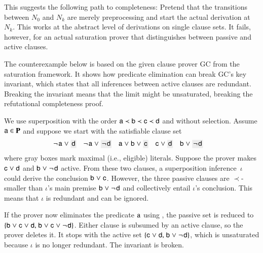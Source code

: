 \begin{rep}
This suggests the following path to completeness: Pretend that the transitions
between $N_0$ and $N_k$ are merely preprocessing and start the actual
derivation at $N_k$. This works at the abstract level of derivations on single
clause sets. It fails, however, for an actual saturation prover that
distinguishes between passive and active clauses.

\begin{exa}
\label{ex:cex-predelim-sat}
The counterexample below is based on the given clause prover \textsf{GC}
from the saturation framework. It shows how predicate elimination can break
\textsf{GC}'s key invariant, which states that all inferences between active
clauses are redundant. Breaking the invariant means that the limit might be
unsaturated, breaking the refutational completeness proof.

We use superposition with the order $\mathsf{a} \prec
\mathsf{b} \prec \mathsf{c} \prec \mathsf{d}$ and without selection.
Assume $\mathsf{a} \in \mathbf{P}$ and
suppose we start with the satisfiable clause set %
%
\begin{align*}
  & \neglit{\cst{a}} \cor \MAX{\cst{d}}
  && \neglit{\cst{a}} \cor \MAX{\neglit{\cst{d}}}
  && \cst{a} \cor \cst{b} \cor \MAX{\cst{c}}
  && \cst{c} \cor \MAX{\cst{d}}
  && \cst{b} \cor \MAX{\neglit{\cst{d}}}
\end{align*}
%
where gray boxes mark maximal (i.e., eligible) literals. Suppose the prover makes
$\mathsf{c} \mathrel{\lor} \mathsf{d}$ and $\mathsf{b} \mathrel{\lor} \neg{\kern.2ex \mathsf{d}}$ active. From these
two clauses, a superposition inference~$\iota$ could derive the conclusion
$\mathsf{b} \mathrel{\lor} \mathsf{c}$. However, the three passive clauses are
$\prec$-smaller than $\iota$'s main premise $\mathsf{b} \mathrel{\lor} \neg{\kern.2ex \mathsf{d}}$ and
collectively entail $\iota$'s conclusion. This means that $\iota$ is
redundant and can be ignored.

If the prover now eliminates the predicate $\mathsf{a}$ using , the
passive set is reduced to $\{\mathsf{b} \mathrel{\lor} \mathsf{c} \mathrel{\lor} \mathsf{d}{,}\;
\mathsf{b} \mathrel{\lor} \mathsf{c} \mathrel{\lor} \neg{\kern.2ex \mathsf{d}}\}$.
%
Either clause is subsumed by an active clause, so the prover deletes it.
It stops with the active set
$\{\mathsf{c} \mathrel{\lor} \mathsf{d}{,}\; \mathsf{b} \mathrel{\lor} \neg{\kern.2ex \mathsf{d}}\}$, which is
unsaturated because $\iota$ is no longer redundant. The invariant is broken.
\end{exa}


\end{rep}

